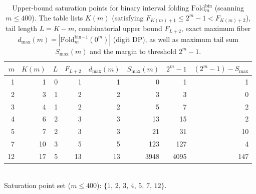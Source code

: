 \begin{table}[H]
\centering
\scriptsize
\setlength{\tabcolsep}{6pt}
\caption{Upper-bound saturation points for binary interval folding $\mathrm{Fold}^{\mathrm{bin}}_m$ (scanning $m\le 400$). The table lists $K(m)$ (satisfying $F_{K(m)+1}\le 2^m-1 < F_{K(m)+2}$), tail length $L=K-m$, combinatorial upper bound $F_{L+2}$, exact maximum fiber $d_{\max}(m)=|\mathrm{Fold}^{\mathrm{bin}}_m{}^{-1}(0^m)|$ (digit DP), as well as maximum tail sum $S_{\max}(m)$ and the margin to threshold $2^m-1$.}
\label{tab:fold_binary_saturation_points}
\begin{tabular}{rrrrrrrr}
\toprule
$m$ & $K(m)$ & $L$ & $F_{L+2}$ & $d_{\max}(m)$ & $S_{\max}(m)$ & $2^m-1$ & $(2^m-1)-S_{\max}$\\
\midrule
1 & 1 & 0 & 1 & 1 & 0 & 1 & 1\\
2 & 3 & 1 & 2 & 2 & 3 & 3 & 0\\
3 & 4 & 1 & 2 & 2 & 5 & 7 & 2\\
4 & 6 & 2 & 3 & 3 & 13 & 15 & 2\\
5 & 7 & 2 & 3 & 3 & 21 & 31 & 10\\
7 & 10 & 3 & 5 & 5 & 123 & 127 & 4\\
12 & 17 & 5 & 13 & 13 & 3948 & 4095 & 147\\
\bottomrule
\end{tabular}
\vspace{4pt}
\\Saturation point set ($m\le 400$): $\{ 1,\,2,\,3,\,4,\,5,\,7,\,12 \}$.
\end{table}
